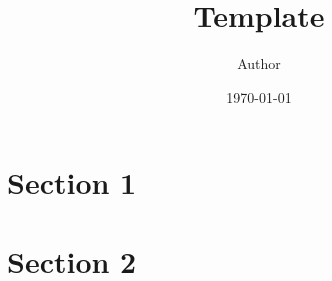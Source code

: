 \documentclass[11pt]{article}
\title{Template}
\author{Author}
\date{\today}
\begin{document}
\maketitle
\pagebreak

\tableofcontents
\pagebreak

\section{Section 1}\label{sec:section1}

\pagebreak


\section{Section 2}\label{sec:section2}

\pagebreak

\printbibliography[]
\end{document}
